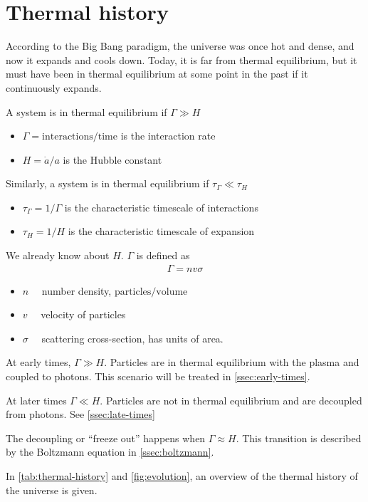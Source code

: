 \section{Thermal history}
\label{sec:thermal-history}

According to the Big Bang paradigm, the universe was once hot and dense, and now it expands and cools down. Today, it is far from thermal equilibrium, but it must have been in thermal equilibrium at some point in the past if it continuously expands.

A system is in thermal equilibrium if $\Gamma \gg H$
\begin{itemize}
	\item $\Gamma = \text{interactions}/\text{time}$ is the interaction rate
	\item $H = \dot{a}/a$ is the Hubble constant
\end{itemize}
Similarly, a system is in thermal equilibrium if $\tau_\Gamma \ll \tau_H$
\begin{itemize}
	\item $\tau_\Gamma = 1/\Gamma$ is the characteristic timescale of interactions
	\item $\tau_H = 1/H$ is the characteristic timescale of expansion
\end{itemize}
We already know about $H$. $\Gamma$ is defined as
\begin{align*}
	\Gamma = n v \sigma
\end{align*}
\begin{itemize}
	\item $n \quad$ number density, $\text{particles}/\text{volume}$
	\item $v \quad$ velocity of particles
	\item $\sigma \quad$ scattering cross-section, has units of area.
\end{itemize}

At early times, $\Gamma \gg H$. Particles are in thermal equilibrium with the plasma and coupled to photons. This scenario will be treated in \cref{ssec:early-times}.

At later times $\Gamma \ll H$. Particles are not in thermal equilibrium and are decoupled from photons. See \cref{ssec:late-times}

The decoupling or \enquote{freeze out} happens when $\Gamma \approx H$. This transition is described by the Boltzmann equation in \cref{ssec:boltzmann}.

In \cref{tab:thermal-history} and \cref{fig:evolution}, an overview of the thermal history of the universe is given.

